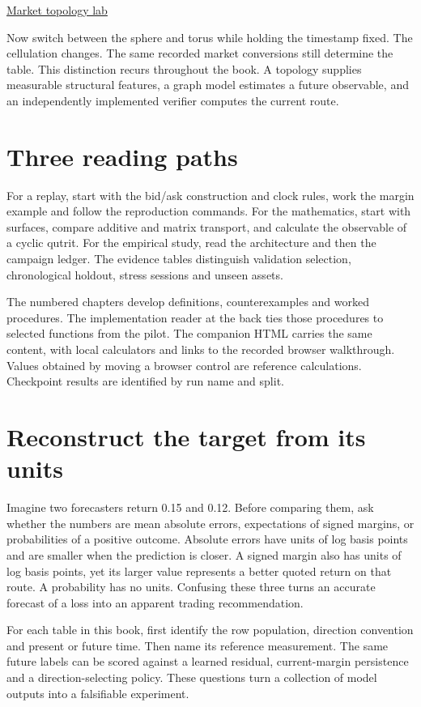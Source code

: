 \documentclass[11pt,oneside,openany]{book}
\begin{document}
{\small\sffamily\href{https://amelie-iska.github.io/phaseweave-lab/}{Market topology lab}\par}
Now switch between the sphere and torus while holding the timestamp fixed. The cellulation changes. The same recorded market conversions still determine the table. This distinction recurs throughout the book. A topology supplies measurable structural features, a graph model estimates a future observable, and an independently implemented verifier computes the current route.

\section*{Three reading paths}
For a replay, start with the bid/ask construction and clock rules, work the margin example and follow the reproduction commands. For the mathematics, start with surfaces, compare additive and matrix transport, and calculate the observable of a cyclic qutrit. For the empirical study, read the architecture and then the campaign ledger. The evidence tables distinguish validation selection, chronological holdout, stress sessions and unseen assets.

The numbered chapters develop definitions, counterexamples and worked procedures. The implementation reader at the back ties those procedures to selected functions from the pilot. The companion HTML carries the same content, with local calculators and links to the recorded browser walkthrough. Values obtained by moving a browser control are reference calculations. Checkpoint results are identified by run name and split.

\section*{Reconstruct the target from its units}
Imagine two forecasters return 0.15 and 0.12. Before comparing them, ask whether the numbers are mean absolute errors, expectations of signed margins, or probabilities of a positive outcome. Absolute errors have units of log basis points and are smaller when the prediction is closer. A signed margin also has units of log basis points, yet its larger value represents a better quoted return on that route. A probability has no units. Confusing these three turns an accurate forecast of a loss into an apparent trading recommendation.

For each table in this book, first identify the row population, direction convention and present or future time. Then name its reference measurement. The same future labels can be scored against a learned residual, current-margin persistence and a direction-selecting policy. These questions turn a collection of model outputs into a falsifiable experiment.
\end{document}

